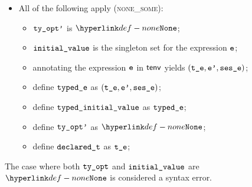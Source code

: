 \begin{itemize}
  \item All of the following apply (\textsc{none\_some}):
  \begin{itemize}
    \item $\tyoptp$ is $\None$;
    \item $\initialvalue$ is the singleton set for the expression $\ve$;
    \item annotating the expression $\ve$ in $\tenv$ yields $(\vte, \vep, \vsese)$\ProseOrTypeError;
    \item define $\typede$ as $(\vte, \vep, \vsese)$;
    \item define $\typedinitialvalue$ as $\typede$;
    \item define $\tyoptp$ as $\None$;
    \item define $\declaredt$ as $\vte$;
  \end{itemize}
\end{itemize}
The case where both $\tyopt$ and $\initialvalue$ are $\None$ is considered a syntax error.

\FormallyParagraph
\begin{mathpar}
\end{mathpar}

